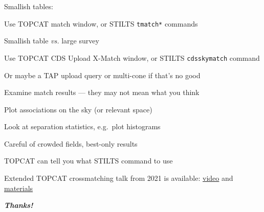 \documentclass[20pt,landscape]{foils}
\newif\ifrubric
\newcommand{\bhref}[2]{\href{#1}{{\color{blue}#2}}}
\begin{document}
\begin{list0}
  \item Smallish tables:
  \begin{list2big}
    \item Use TOPCAT match window,
          or STILTS {\color{brown}\tt tmatch*} commands
  \end{list2big}
  \item Smallish table {\sl vs.\/} large survey
  \begin{list2big}
    \item Use TOPCAT CDS Upload X-Match window,
          or STILTS {\color{brown}\tt cdsskymatch} command
    \item Or maybe a TAP upload query or multi-cone if that's no good
  \end{list2big}
  \item Examine match results --- they may not mean what you think
  \begin{list2big}
    \item Plot associations on the sky (or relevant space)
    \item Look at separation statistics, e.g.\ plot histograms
    \item Careful of crowded fields, best-only results
  \end{list2big}
  \item TOPCAT can tell you what STILTS command to use
  \item Extended TOPCAT crossmatching talk from 2021 is available:
        \bhref{https://youtu.be/mdMtmy3Zq-Q&t=3582s}{video} and
        \bhref{https://www.star.bristol.ac.uk/mbt/talks/shristi2021/}{materials}
\end{list0}

\vspace{0.2cm}
\begin{center}
  {\color{darkred}\Huge\bf\sl Thanks!}
\end{center}

\label{lastPage}

\ifrubric
\end{document}
